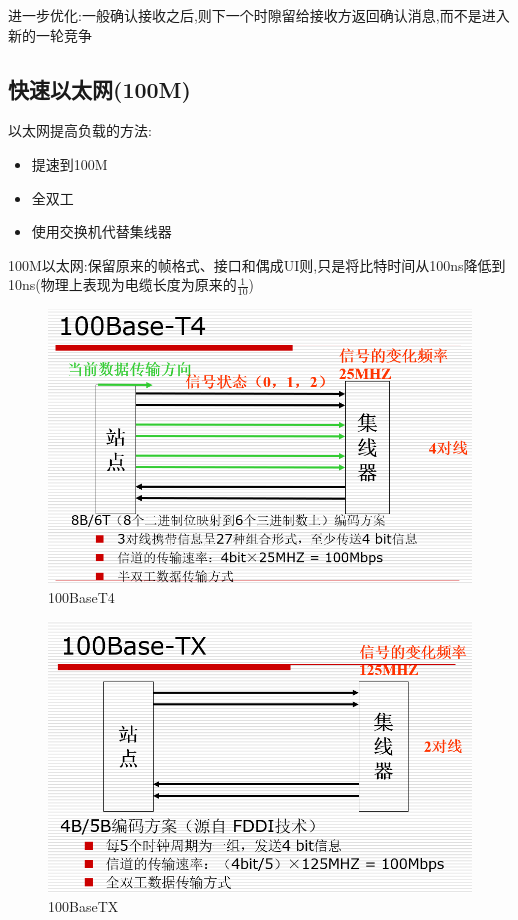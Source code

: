 \documentclass[UTF8,a4paper]{ctexart}
\begin{document}
进一步优化:一般确认接收之后,则下一个时隙留给接收方返回确认消息,而不是进入新的一轮竞争

\subsection{快速以太网(100M)}
以太网提高负载的方法:
\begin{itemize}
  \item 提速到100M
  \item 全双工
  \item 使用交换机代替集线器
\end{itemize}

100M以太网:保留原来的帧格式、接口和偶成UI则,只是将比特时间从100ns降低到10ns(物理上表现为电缆长度为原来的$\frac{1}{10}$)

\begin{figure}[H]
  \centering
  \includegraphics[scale = 0.3]{assets/jisuanjiwangluo_7150c.png}
  \caption{100BaseT4}
\end{figure}


\begin{figure}[H]
  \centering
  \includegraphics[scale = 0.3]{assets/jisuanjiwangluo_7fbf4.png}
  \caption{100BaseTX}
\end{figure}
\end{document}
